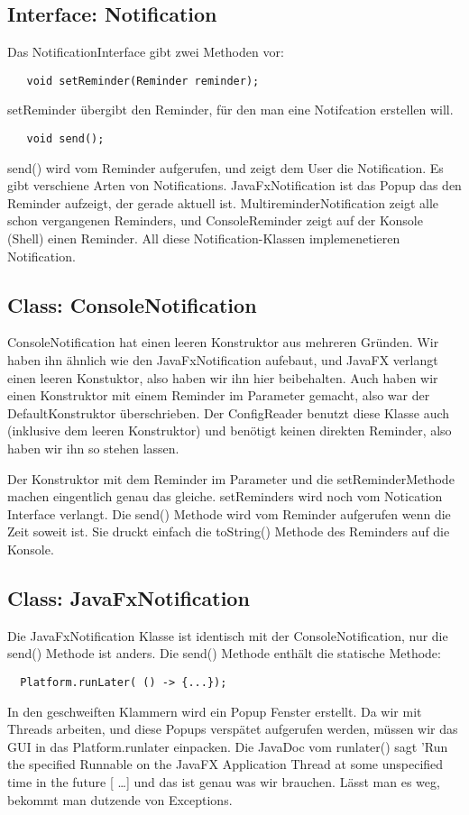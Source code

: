\subsection{Interface: Notification}
Das NotificationInterface gibt zwei Methoden vor:

\begin{lstlisting}
   void setReminder(Reminder reminder);
\end{lstlisting}
setReminder übergibt den Reminder, für den man eine Notifcation erstellen will.

\begin{lstlisting}
   void send();
\end{lstlisting}
send() wird vom Reminder aufgerufen, und zeigt dem User die Notification. Es gibt verschiene Arten von Notifications.
JavaFxNotification ist das Popup das den Reminder aufzeigt, der gerade aktuell ist. MultireminderNotification
zeigt alle schon vergangenen Reminders, und ConsoleReminder zeigt auf der Konsole (Shell) einen Reminder.
All diese Notification-Klassen implemenetieren Notification.


\subsection{Class: ConsoleNotification}
ConsoleNotification hat einen leeren Konstruktor aus mehreren Gründen. Wir haben ihn ähnlich wie den JavaFxNotification aufebaut,
und JavaFX verlangt einen leeren Konstuktor, also haben wir ihn hier beibehalten. Auch haben wir einen Konstruktor mit einem Reminder im Parameter gemacht,
also war der DefaultKonstruktor überschrieben.
Der ConfigReader benutzt diese Klasse auch (inklusive dem leeren Konstruktor) und benötigt keinen direkten Reminder, also haben wir ihn so stehen lassen.

Der Konstruktor mit dem Reminder im Parameter und die setReminderMethode machen eingentlich genau das gleiche. setReminders wird noch vom Notication Interface verlangt.
Die send() Methode wird vom Reminder aufgerufen wenn die Zeit soweit ist. Sie druckt einfach die toString() Methode des Reminders auf die Konsole.


\subsection{Class: JavaFxNotification}
Die JavaFxNotification Klasse ist identisch mit der ConsoleNotification, nur die send() Methode ist anders.
Die send() Methode enthält die statische Methode:
\begin{lstlisting}
  Platform.runLater( () -> {...});
\end{lstlisting}
In den geschweiften Klammern wird ein Popup Fenster erstellt. Da wir mit Threads arbeiten, und diese Popups verspätet aufgerufen werden,
müssen wir das GUI in das Platform.runlater einpacken. Die JavaDoc vom runlater() sagt 'Run the specified Runnable on the JavaFX Application
Thread at some unspecified time in the future [ \dots ]
und das ist genau was wir brauchen. Lässt man es weg, bekommt man dutzende von Exceptions.

